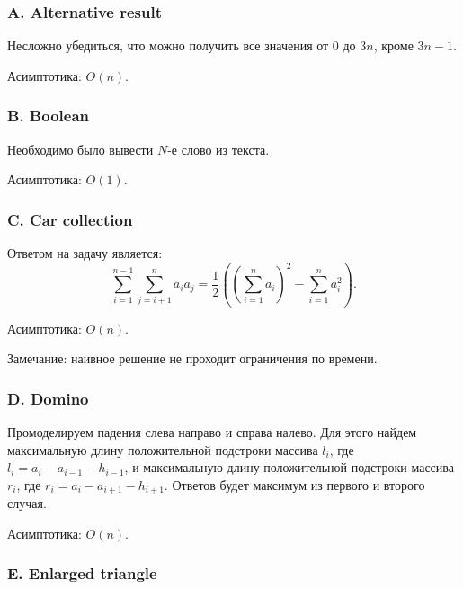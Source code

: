 \subsubsection*{A. Alternative result} 


Несложно убедиться, что можно получить все значения от 0 до $3n$, кроме $3n-1$.

Асимптотика: $O(n)$.



\subsubsection*{B. Boolean} 


Необходимо было вывести $N$-е слово из текста.

Асимптотика: $O(1)$.



\subsubsection*{C. Car collection} 


Ответом на задачу является:
$$\sum_{i=1}^{n-1} \sum_{j=i+1}^{n} a_i a_j = \frac{1}{2} \left( (\sum_{i=1}^{n} {a_i})^2 - \sum_{i=1}^{n} a_i^2 \right).$$

Асимптотика: $O(n)$.

Замечание: наивное решение не проходит ограничения по времени.



\subsubsection*{D. Domino} 


Промоделируем падения слева направо и справа налево. Для этого найдем максимальную длину положительной подстроки массива $l_i$, где $l_i = a_i - a_{i-1} - h_{i-1}$, и максимальную длину положительной подстроки массива $r_i$, где $r_i = a_i - a_{i+1} - h_{i+1}$. Ответов будет максимум из первого и второго случая.

Асимптотика: $O(n)$.



\subsubsection*{E. Enlarged triangle} 

